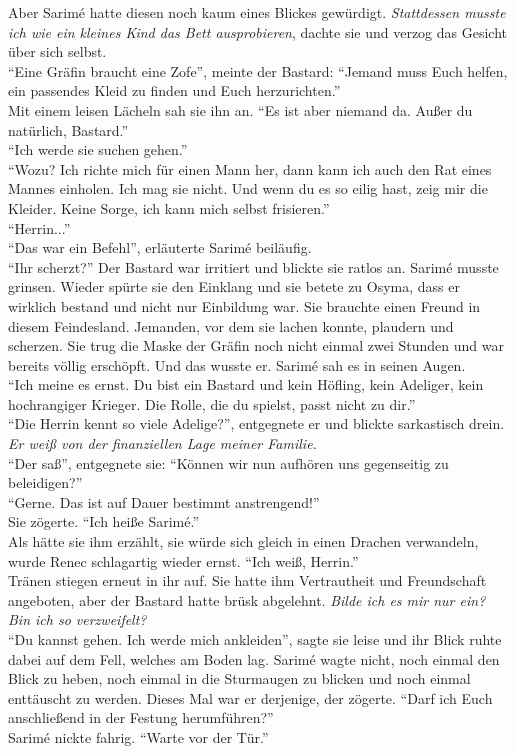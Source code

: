 Aber Sarimé hatte diesen noch kaum eines Blickes gewürdigt. \textit{Stattdessen musste ich wie ein 
kleines Kind das Bett ausprobieren}, dachte sie und verzog das Gesicht über sich selbst.\\
``Eine Gräfin braucht eine Zofe'', meinte der Bastard: ``Jemand muss Euch helfen, ein passendes 
Kleid zu finden und Euch herzurichten.''\\
Mit einem leisen Lächeln sah sie ihn an. ``Es ist aber niemand da. Außer du natürlich, Bastard.''\\
``Ich werde sie suchen gehen.''\\
``Wozu? Ich richte mich für einen Mann her, dann kann ich auch den Rat eines Mannes einholen. Ich 
mag sie nicht. Und wenn du es so eilig hast, zeig mir die Kleider. Keine Sorge, ich kann mich 
selbst frisieren.''\\
``Herrin...''\\
``Das war ein Befehl'', erläuterte Sarimé beiläufig. \\
``Ihr scherzt?'' Der Bastard war irritiert und blickte sie ratlos an. Sarimé musste grinsen. Wieder 
spürte sie den Einklang und sie betete zu Osyma, dass er wirklich bestand und nicht nur Einbildung 
war. Sie brauchte einen Freund in diesem Feindesland. Jemanden, vor dem sie lachen konnte, plaudern 
und scherzen. Sie trug die Maske der Gräfin noch nicht einmal zwei Stunden und war bereits völlig 
erschöpft. Und das wusste er. Sarimé sah es in seinen Augen. \\
``Ich meine es ernst. Du bist ein Bastard und kein Höfling, kein Adeliger, kein hochrangiger 
Krieger. Die Rolle, die du spielst, passt nicht zu dir.''\\
``Die Herrin kennt so viele Adelige?'', entgegnete er und blickte sarkastisch drein.\\
\textit{Er weiß von der finanziellen Lage meiner Familie.}\\ 
``Der saß'', entgegnete sie: ``Können wir nun aufhören uns gegenseitig zu beleidigen?''\\
``Gerne. Das ist auf Dauer bestimmt anstrengend!''\\
Sie zögerte. ``Ich heiße Sarimé.''\\
Als hätte sie ihm erzählt, sie würde sich gleich in einen Drachen verwandeln, wurde Renec 
schlagartig wieder ernst. ``Ich weiß, Herrin.''\\
Tränen stiegen erneut in ihr auf. Sie hatte ihm Vertrautheit und Freundschaft angeboten, aber der 
Bastard hatte brüsk abgelehnt. \textit{Bilde ich es mir nur ein? Bin ich so verzweifelt?}\\
``Du kannst gehen. Ich werde mich ankleiden'', sagte sie leise und ihr Blick ruhte dabei auf 
dem Fell, welches am Boden lag. Sarimé wagte nicht, noch einmal den Blick zu heben, noch einmal in 
die Sturmaugen zu blicken und noch einmal enttäuscht zu werden. Dieses Mal war er derjenige, der 
zögerte. ``Darf ich Euch anschließend in der Festung herumführen?''\\
Sarimé nickte fahrig. ``Warte vor der Tür.''\\


